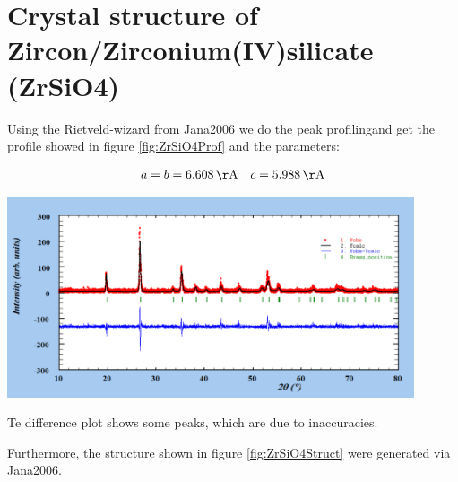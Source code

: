 \newpage

\section{Crystal structure of Zircon/Zirconium(IV)silicate (ZrSiO4)}
\label{sec:ZrSiO4}

Using the Rietveld-wizard from Jana2006 we do the peak profilingand get the profile showed in figure \ref{fig:ZrSiO4Prof} and the parameters:

\begin{align}
    a=b=6.608\,\mathrm{\AA} \quad c=5.988\,\mathrm{\AA}
\end{align}


\begin{center}
    \captionsetup{type = figure}
    \includegraphics[width = 0.9\textwidth]{Pictures/Evaluation/43/ZrSiO4DataAll.png}
    \label{fig:ZrSiO4Prof}
\end{center}
Te difference plot shows some peaks,  which are due to inaccuracies.

Furthermore, the structure shown in figure \ref{fig:ZrSiO4Struct} were generated via Jana2006.


